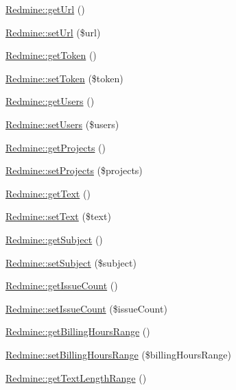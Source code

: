 \begin{DoxyCompactItemize}
\item 
\mbox{\hyperlink{namespace_redmine_a2ccb575a43abede07a2cdbe8bfea24fa}{Redmine\+::get\+Url}} ()
\item 
\mbox{\hyperlink{namespace_redmine_acc9b6a78b1adb42c8c1349ea4dcba232}{Redmine\+::set\+Url}} (\$url)
\item 
\mbox{\hyperlink{namespace_redmine_ab2f1e25f6992a73d074aaeb368e2bdc0}{Redmine\+::get\+Token}} ()
\item 
\mbox{\hyperlink{namespace_redmine_a1d837cc954679842432361136a6895c9}{Redmine\+::set\+Token}} (\$token)
\item 
\mbox{\hyperlink{namespace_redmine_a209ad0ad13e2884eda66992c4d377a4d}{Redmine\+::get\+Users}} ()
\item 
\mbox{\hyperlink{namespace_redmine_a8f0a510d45ae023aadca0cc62f3d72a0}{Redmine\+::set\+Users}} (\$users)
\item 
\mbox{\hyperlink{namespace_redmine_a9be2d9a55b3df3a3b4f37a9b4878e813}{Redmine\+::get\+Projects}} ()
\item 
\mbox{\hyperlink{namespace_redmine_a67b98dbb37cb8c4e8d8f68155e3fbe0a}{Redmine\+::set\+Projects}} (\$projects)
\item 
\mbox{\hyperlink{namespace_redmine_a4850ca0eec8345f1ee03cfcc7294896f}{Redmine\+::get\+Text}} ()
\item 
\mbox{\hyperlink{namespace_redmine_a980d608a51d51eec7049f1f566ea57b6}{Redmine\+::set\+Text}} (\$text)
\item 
\mbox{\hyperlink{namespace_redmine_ac2b99e9dd9acc77c7afaa9b55c395477}{Redmine\+::get\+Subject}} ()
\item 
\mbox{\hyperlink{namespace_redmine_ae00b1697ef0ceff7cdd142c54fd89729}{Redmine\+::set\+Subject}} (\$subject)
\item 
\mbox{\hyperlink{namespace_redmine_aefa4df1e77da1c4738d8758d9f3b4193}{Redmine\+::get\+Issue\+Count}} ()
\item 
\mbox{\hyperlink{namespace_redmine_ad9ebffe5cfc3f49dd3a620f55536783c}{Redmine\+::set\+Issue\+Count}} (\$issue\+Count)
\item 
\mbox{\hyperlink{namespace_redmine_a1ac3a8bc207665303d677efdbbe45668}{Redmine\+::get\+Billing\+Hours\+Range}} ()
\item 
\mbox{\hyperlink{namespace_redmine_afbc4a2cbda2d9fbad5b50c50052cc1d7}{Redmine\+::set\+Billing\+Hours\+Range}} (\$billing\+Hours\+Range)
\item 
\mbox{\hyperlink{namespace_redmine_a3e0bcb30f7c170ef7583b717c4357916}{Redmine\+::get\+Text\+Length\+Range}} ()

\end{DoxyCompactItemize}
